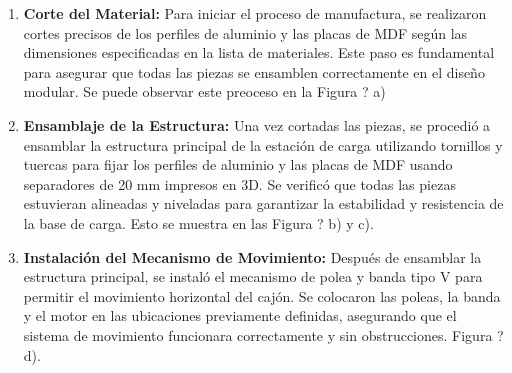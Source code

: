     \begin{enumerate}
        \item \textbf{Corte del Material:} Para iniciar el proceso de manufactura, se realizaron cortes precisos de los perfiles de aluminio y las placas de MDF según las dimensiones especificadas en la lista de materiales. Este paso es fundamental para asegurar que todas las piezas se ensamblen correctamente en el diseño modular. Se puede observar este preoceso en la Figura ? a) 
            
        \item \textbf{Ensamblaje de la Estructura:} Una vez cortadas las piezas, se procedió a ensamblar la estructura principal de la estación de carga utilizando tornillos y tuercas para fijar los perfiles de aluminio y las placas de MDF usando separadores de 20 mm impresos en 3D. Se verificó que todas las piezas estuvieran alineadas y niveladas para garantizar la estabilidad y resistencia de la base de carga. Esto se muestra en las Figura ? b) y c).
            
        \item \textbf{Instalación del Mecanismo de Movimiento:} Después de ensamblar la estructura principal, se instaló el mecanismo de polea y banda tipo V para permitir el movimiento horizontal del cajón. Se colocaron las poleas, la banda y el motor en las ubicaciones previamente definidas, asegurando que el sistema de movimiento funcionara correctamente y sin obstrucciones. Figura ? d).
        
    \end{enumerate}

